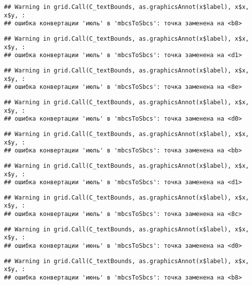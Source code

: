 \documentclass[
]{article}
\begin{document}
\begin{verbatim}
## Warning in grid.Call(C_textBounds, as.graphicsAnnot(x$label), x$x, x$y, :
## ошибка конвертации 'июль' в 'mbcsToSbcs': точка заменена на <b8>
\end{verbatim}

\begin{verbatim}
## Warning in grid.Call(C_textBounds, as.graphicsAnnot(x$label), x$x, x$y, :
## ошибка конвертации 'июль' в 'mbcsToSbcs': точка заменена на <d1>
\end{verbatim}

\begin{verbatim}
## Warning in grid.Call(C_textBounds, as.graphicsAnnot(x$label), x$x, x$y, :
## ошибка конвертации 'июль' в 'mbcsToSbcs': точка заменена на <8e>
\end{verbatim}

\begin{verbatim}
## Warning in grid.Call(C_textBounds, as.graphicsAnnot(x$label), x$x, x$y, :
## ошибка конвертации 'июль' в 'mbcsToSbcs': точка заменена на <d0>
\end{verbatim}

\begin{verbatim}
## Warning in grid.Call(C_textBounds, as.graphicsAnnot(x$label), x$x, x$y, :
## ошибка конвертации 'июль' в 'mbcsToSbcs': точка заменена на <bb>
\end{verbatim}

\begin{verbatim}
## Warning in grid.Call(C_textBounds, as.graphicsAnnot(x$label), x$x, x$y, :
## ошибка конвертации 'июль' в 'mbcsToSbcs': точка заменена на <d1>
\end{verbatim}

\begin{verbatim}
## Warning in grid.Call(C_textBounds, as.graphicsAnnot(x$label), x$x, x$y, :
## ошибка конвертации 'июль' в 'mbcsToSbcs': точка заменена на <8c>
\end{verbatim}

\begin{verbatim}
## Warning in grid.Call(C_textBounds, as.graphicsAnnot(x$label), x$x, x$y, :
## ошибка конвертации 'июнь' в 'mbcsToSbcs': точка заменена на <d0>
\end{verbatim}

\begin{verbatim}
## Warning in grid.Call(C_textBounds, as.graphicsAnnot(x$label), x$x, x$y, :
## ошибка конвертации 'июнь' в 'mbcsToSbcs': точка заменена на <b8>
\end{verbatim}
\end{document}
